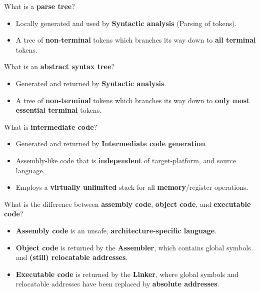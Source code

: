 \documentclass[11pt]{beamer}
\begin{document}
\begin{frame}

\begin{block}{What is a \textbf{parse tree}?}
\begin{itemize}
\item Locally generated and used by \textbf{Syntactic analysis} (Parsing of tokens).
\item A tree of \textbf{non-terminal} tokens which branches its way down to \textbf{all terminal} tokens.
\end{itemize}
\end{block}

\begin{block}{What is an \textbf{abstract syntax tree}?}
\begin{itemize}
\item Generated and returned by \textbf{Syntactic analysis}.
\item A tree of \textbf{non-terminal} tokens which branches its way down to \textbf{only most essential terminal} tokens.
\end{itemize}
\end{block}

\end{frame}


\begin{frame}

\begin{block}{What is \textbf{intermediate code}?}
\begin{itemize}
\item Generated and returned by \textbf{Intermediate code generation}.
\item Assembly-like code that is \textbf{independent} of target-platform, and source language.
\item Employs a \textbf{virtually unlimited} stack for all \textbf{memory}/register operations.
\end{itemize}
\end{block}

\begin{block}{What is the difference between \textbf{assembly code}, \textbf{object code}, and \textbf{executable code}? }
\begin{itemize}
\item \textbf{Assembly code} is an unsafe, \textbf{architecture-specific language}.
\item \textbf{Object code} is returned by the \textbf{Assembler}, which contains global symbols and \textbf{(still) relocatable addresses}.
\item \textbf{Executable code} is returned by the \textbf{Linker}, where global symbols and relocatable addresses have been replaced by \textbf{absolute addresses}.
\end{itemize}
\end{block}

\end{frame}
\end{document}

